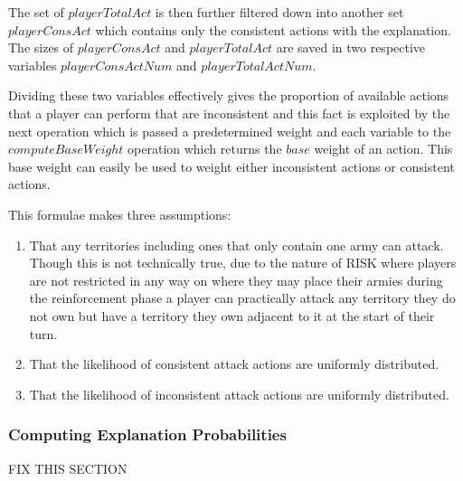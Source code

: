 \documentclass[parskip]{cs4rep}
\begin{document}
The set of $playerTotalAct$ is then further filtered down into another set $playerConsAct$ which contains only the consistent actions with the explanation. The sizes of $playerConsAct$ and $playerTotalAct$ are saved in two respective variables $playerConsActNum$ and $playerTotalActNum$.

Dividing these two variables effectively gives the proportion of available actions that a player can perform that are inconsistent and this fact is exploited by the next operation which is passed a predetermined weight and each variable to the $computeBaseWeight$ operation which returns the $base$ weight of an action. This base weight can easily be used to weight either inconsistent actions or consistent actions.

This formulae makes three assumptions:

\begin{enumerate}
\item
That any territories including ones that only contain one army can attack. Though this is not technically true, due to the nature of RISK where players are not restricted in any way on where they may place their armies during the reinforcement phase a player can practically attack any territory they do not own but have a territory they own adjacent to it at the start of their turn.
\item
That the likelihood of consistent attack actions are uniformly distributed.
\item
That the likelihood of inconsistent attack actions are uniformly distributed.
\end{enumerate}

\subsubsection{Computing Explanation Probabilities}

FIX THIS SECTION
\end{document}
